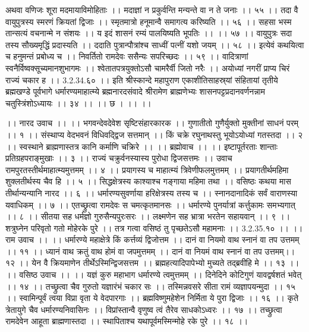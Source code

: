 अथवा वणिजः शूरा मदमायाविमोहिताः ।।
मदाज्ञां न प्रकुर्वन्ति मन्यन्ते वा न ते जनाः ।। ५५ ।।
तदा वै वायुपुत्रस्य स्मरणं क्रियतां द्विजाः ।।
स्मृतमात्रो हनूमान्वै समागत्य करिष्यति ।। ५६ ।।
सहसा भस्म तान्सत्यं वचनान्मे न संशयः ।।
य इदं शासनं रम्यं पालयिष्यति भूपतिः ।। ।। ५७ ।।
वायुपुत्रः सदा तस्य सौख्यमृद्धिं प्रदास्यति ।।
ददाति पुत्रान्पौत्रांश्च साध्वीं पत्नीं यशो जयम् ।। ५८ ।।
इत्येवं कथयित्वा च हनुमन्तं प्रबोध्य च ।।
निवर्तितो रामदेवः ससैन्यः सपरिच्छदः ।। ५९ ।।
वादित्राणां स्वनैर्विष्वक्सूच्यमानशुभागमः ।।
श्वेतातपत्रयुक्तोऽसौ चामरैर्वी जितो नरैः ।।
अयोध्यां नगरीं प्राप्य चिरं राज्यं चकार ह ।। 3.2.34.६० ।।
इति श्रीस्कान्दे महापुराण एकाशीतिसाहस्र्यां संहितायां तृतीये ब्रह्मखण्डे पूर्वभागे धर्मारण्यमाहात्म्ये ब्रह्मनारदसंवादे श्रीरामेण ब्राह्मणेभ्यः शासनपट्टप्रदानवर्णनन्नाम चतुस्त्रिंशोऽध्यायः ।। ३४ ।। ।। छ । ।। ।।

।। नारद उवाच ।। ।।
भगवन्देवदेवेश सृष्टिसंहारकारक ।।
गुणातीतो गुणैर्युक्तो मुक्तीनां साधनं परम् ।। १ ।।
संस्थाप्य वेदभवनं विधिवद्द्विज सत्तमान् ।।
किं चक्रे रघुनाथस्तु भूयोऽयोध्यां गतस्तदा ।। २ ।।
स्वस्थाने ब्राह्मणास्तत्र कानि कर्माणि चक्रिरे ।।
।। ब्रह्मोवाच ।। ।।
इष्टापूर्तरताः शान्ताः प्रतिग्रहपराङ्मुखाः ।। ३ ।।
राज्यं चक्रुर्वनस्यास्य पुरोधा द्विजसत्तमः ।।
उवाच रामपुरतस्तीर्थमाहात्म्यमुत्तमम् ।। ४ ।।
प्रयागस्य च माहात्म्यं त्रिवेणीफलमुत्तमम् ।।
प्रयागतीर्थमहिमा शुक्लतीर्थस्य चैव हि ।। ५ ।।
सिद्धक्षेत्रस्य काश्याश्च गङ्गाया महिमा तथा ।।
वसिष्ठः कथया मास तीर्थान्यन्यानि नारद ।। ६ ।।
धर्मारण्यसुवर्णाया हरिक्षेत्रस्य तस्य च ।।
स्नानदानादिकं सर्वं वाराणस्या यवाधिकम् ।। ७ ।।
एतच्छ्रुत्वा रामदेवः स चमत्कृतमानसः ।।
धर्मारण्ये पुनर्यात्रां कर्त्तुकामः समभ्यगात् ।। ८ ।।
सीतया सह धर्मज्ञो गुरुसैन्यपुरःसरः ।।
लक्ष्मणेन सह भ्रात्रा भरतेन सहायवान् ।। ९ ।।
शत्रुघ्नेन परिवृतो गतो मोहेरके पुरे ।।
तत्र गत्वा वसिष्ठं तु पृच्छतेऽसौ महामनाः ।। 3.2.35.१० ।।
।। राम उवाच ।। ।।
धर्मारण्ये महाक्षेत्रे किं कर्त्तव्यं द्विजोत्तम ।।
दानं वा नियमो वाथ स्नानं वा तप उत्तमम् ।। ११ ।।
 ध्यानं वाथ क्रतुं वाथ होमं वा जपमुत्तमम् ।।
दानं वा नियमं वाथ स्नानं वा तप उत्तमम्।। १२ ।।
येन वै क्रियमाणेन तीर्थेऽस्मिन्द्विजसत्तम ।।
ब्रह्महत्यादिपापेभ्यो मुच्यते तद्ब्रवीहि मे ।। १३ ।।
।। वसिष्ठ उवाच ।। ।।
यज्ञं कुरु महाभाग धर्मारण्ये त्वमुत्तमम् ।।
दिनेदिने कोटिगुणं यावद्वर्षशतं भवेत् ।। १४ ।।
तच्छ्रुत्वा चैव गुरुतो यज्ञारंभं चकार सः ।।
तस्मिन्नवसरे सीता रामं व्यज्ञापयन्मुदा ।। १५ ।।
स्वामिन्पूर्वं त्वया विप्रा वृता ये वेदपारगाः ।।
ब्रह्मविष्णुमहेशेन निर्मिता ये पुरा द्विजाः ।। १६ ।।
कृते त्रेतायुगे चैव धर्मारण्यनिवासिनः ।।
विप्रांस्तान्वै वृणुष्व त्वं तैरेव साधकोऽध्वरः ।। १७ ।।
तच्छ्रुत्वा रामदेवेन आहूता ब्राह्मणास्तदा ।।
स्थापिताश्च यथापूर्वमस्मिन्मोहे रके पुरे ।। १८ ।।
